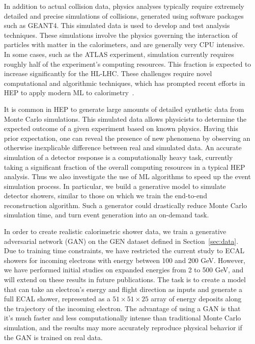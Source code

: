 In addition to actual collision data, physics analyses typically require extremely detailed and precise simulations of collisions, generated using software packages such as GEANT4\cite{GEANT4}. This simulated data is used to develop and test analysis techniques. These simulations involve the physics governing the interaction of particles with matter in the calorimeters, and are generally very CPU intensive. In some cases, such as the ATLAS experiment, simulation currently requires roughly half of the experiment's computing resources\cite{GEANT_usage}. This fraction is expected to increase significantly for the HL-LHC. These challenges require novel computational and algorithmic techniques, which has prompted recent efforts in HEP to apply modern ML to calorimetry~\cite{ML1,ML2,ML3,ML4}.

It is common in HEP to generate large amounts of detailed synthetic data from Monte Carlo simulations. This simulated data allows physicists to determine the expected outcome of a given experiment based on known physics. Having this prior expectation, one can reveal the presence of new phenomena by observing an otherwise inexplicable difference between real and simulated data. An accurate simulation of a detector response is a computationally heavy task, currently taking a significant fraction of the overall computing resources in a typical HEP analysis. Thus we also investigate the use of ML algorithms to speed up the event simulation process. In particular, we build a generative model to simulate detector showers, similar to those on which we train the end-to-end reconstruction algorithm. Such a generator could drastically reduce Monte Carlo simulation time, and turn event generation into an on-demand task.

In order to create realistic calorimetric shower data, we train a generative adversarial network (GAN) on the GEN dataset defined in Section~\ref{sec:data}. Due to training time constraints, we have restricted the current study to ECAL showers for incoming electrons with energy between 100 and 200 GeV. However, we have performed initial studies on expanded energies from 2 to 500 GeV, and will extend on these results in future publications. The task is to create a model that can take an electron's energy and flight direction as inputs and generate a full ECAL shower, represented as a $51 \times 51 \times 25$ array of energy deposits along the trajectory of the incoming electron. 
The advantage of using a GAN is that it's much faster and less computationally intense than traditional Monte Carlo simulation, and the results may more accurately reproduce physical behavior if the GAN is trained on real data.

